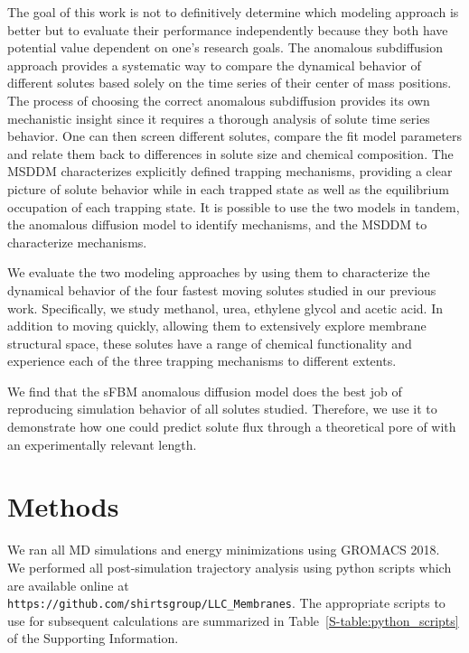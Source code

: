 \documentclass{article}
\begin{document}
  The goal of this work is not to definitively determine which modeling approach
  is better but to evaluate their performance independently because they both
  have potential value dependent on one's research goals. The anomalous subdiffusion
  approach provides a systematic way to compare the dynamical behavior of different
  solutes based solely on the time series of their center of mass positions. The process
  of choosing the correct anomalous subdiffusion provides its own mechanistic insight
  since it requires a thorough analysis of solute time series behavior. One can then
  screen different solutes, compare the fit model parameters and relate them back to 
  differences in solute size and chemical composition. The MSDDM characterizes 
  explicitly defined trapping mechanisms, providing a clear picture of solute behavior
  while in each trapped state as well as the equilibrium occupation of each trapping state.
  It is possible to use the two models in tandem, the anomalous diffusion model to
  identify mechanisms, and the MSDDM to characterize mechanisms. 
  
  We evaluate the two modeling approaches by using them to characterize the dynamical
  behavior of the four fastest moving solutes studied in our previous work.
  Specifically, we study methanol, urea, ethylene glycol and acetic acid. In addition
  to moving quickly, allowing them to extensively explore membrane structural space,
  these solutes have a range of chemical functionality and experience each of the 
  three trapping mechanisms to different extents.
  
  We find that the sFBM anomalous diffusion model does the best job of reproducing
  simulation behavior of all solutes studied. Therefore, we use it to demonstrate 
  how one could predict solute flux through a theoretical pore of with an 
  experimentally relevant length.
  

  \section{Methods}
    
  We ran all MD simulations and energy minimizations using GROMACS 2018. 
  ~\cite{bekker_gromacs:_1993,berendsen_gromacs:_1995,van_der_spoel_gromacs:_2005,hess_gromacs_2008}
  We performed all post-simulation trajectory analysis using python scripts which 
  are available online at \\ \texttt{https://github.com/shirtsgroup/LLC\_Membranes}.
  The appropriate scripts to use for subsequent calculations are summarized in 
  Table~\ref{S-table:python_scripts} of the Supporting Information.
  
\end{document}
